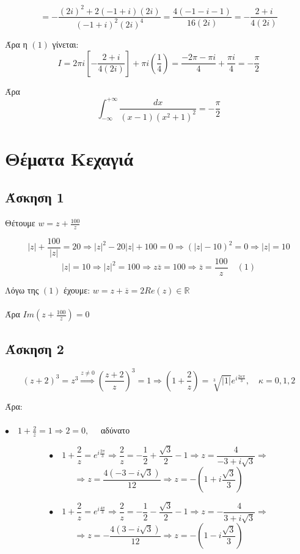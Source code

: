 \documentclass[12pt]{article}
\begin{document}
$$= -\frac{(2i)^2+2(-1+i)(2i)}{(-1+i)^2(2i)^4}= \frac{4(-1-i-1 )}{16(2i)}= -\frac{2+i}{4(2i)} $$

Άρα η $(1)$ γίνεται:
\\
$$ Ι=2\pi i \left[ -\frac{2+i}{4(2i)} \right] + \pi i \left( \frac{1}{4} \right) = \frac{ -2\pi -\pi i}{4} + \frac{ \pi i}{4}= -\frac{ \pi}{2}$$

Άρα $$ \int_{-\infty}^{+\infty} \frac{dx}{(x-1)(x^2+1)^2}=-\frac{ \pi}{2} $$
\newpage

 \section{Θέματα Κεχαγιά}

 \subsection{Άσκηση 1}

Θέτουμε $ w=z+\frac{100}{z}$

$$ |z|+\frac{100}{|z|}=20 \Rightarrow |z|^2 -20|z|+100=0 \Rightarrow (|z|-10)^2=0\Rightarrow |z|=10$$
$$|z|=10 \Rightarrow |z|^2=100 \Rightarrow z\overline{z}=100 \Rightarrow \overline{z}=\frac{100}{z} \quad (1)$$

Λόγω της $(1)$ έχουμε: $w=z+\overline{z}=2Re(z)\in\mathbb{R}$
\\ \\
Άρα $Im\left( z+\frac{100}{z} \right)=0$

 \subsection{Άσκηση 2}

$$(z+2)^3=z^3\overset{z\neq0}{\Longrightarrow} \left( \frac{z+2}{z} \right)^3=1 \Rightarrow \left( 1 + \frac{2}{z} \right)=\sqrt[3]{|1|}e^{i \frac{2\kappa \pi}{3}},\quad \kappa = 0,1,2 $$

Άρα:
\\ \\
$ \bullet \quad 1 + \frac{2}{z}=1\Rightarrow 2=0 ,\quad$
αδύνατο

$$ \bullet \quad 1 + \frac{2}{z}= e^{i \frac{2 \pi}{3}} \Rightarrow \frac{2}{z}= -\frac{1}{2} + \frac{\sqrt{3}}{2} - 1 \Rightarrow z=\frac{4}{-3+i \sqrt{3}} \Rightarrow $$
$$ \Rightarrow z=\frac{4(-3-i \sqrt{3})}{12} \Rightarrow z=-\left(1+i \frac{\sqrt{3}}{3}\right)  $$

$$ \bullet \quad 1 + \frac{2}{z}= e^{i \frac{4 \pi}{3}} \Rightarrow \frac{2}{z}= -\frac{1}{2} - \frac{\sqrt{3}}{2} - 1 \Rightarrow z=-\frac{4}{3+i \sqrt{3}} \Rightarrow $$
$$ \Rightarrow z=-\frac{4(3-i \sqrt{3})}{12} \Rightarrow z=-\left(1-i \frac{\sqrt{3}}{3}\right)  $$
\end{document}
